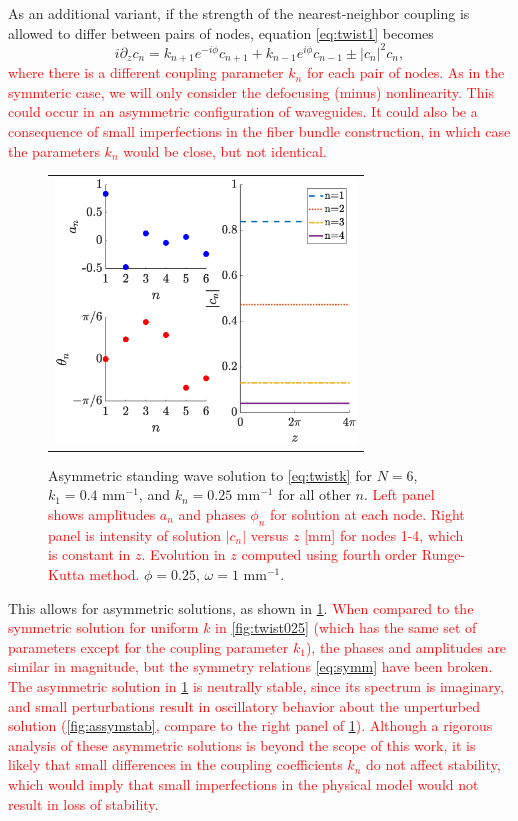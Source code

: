 \documentclass[reprint, amsmath,amssymb,aps,pra]{revtex4-2}
\def\noi{\noindent}
\renewcommand{\revised}[1]{ \textcolor{red}{#1} }
\begin{document}
As an additional variant, if the strength of the nearest-neighbor coupling is allowed to differ between pairs of nodes, equation \cref{eq:twist1} becomes
\begin{equation}\label{eq:twistk}
i \partial_z c_n = k_{n+1} e^{-i\phi}c_{n+1} + k_{n-1} e^{i\phi}c_{n-1} \pm |c_n|^2 c_n,
\end{equation}
\revised{where there is a different coupling parameter $k_n$ for each pair of nodes. As in the symmteric case, we will  only consider the defocusing (minus) nonlinearity. This could occur in an asymmetric configuration of waveguides. It could also be a consequence of small imperfections in the fiber bundle construction, in which case the parameters $k_n$ would be close, but not identical.}
\begin{figure}
\begin{center}
\begin{tabular}{c}
\includegraphics[width=8cm]{even6assym.eps}
\end{tabular}
\end{center}
\caption{Asymmetric standing wave solution to \cref{eq:twistk} for $N = 6$, $k_1 = 0.4\text{ mm}^{-1}$, and $k_n = 0.25\text{ mm}^{-1}$ for all other $n$. \revised{Left panel shows amplitudes $a_n$ and phases $\phi_n$ for solution at each node. Right panel is intensity of solution $|c_n|$ versus $z$ [mm] for nodes 1-4, which is constant in $z$. Evolution in $z$ computed using fourth order Runge-Kutta method.} $\phi = 0.25$, $\omega = 1\text{ mm}^{-1}$.}
\label{fig:even6assym}
\end{figure}
\noi This allows for asymmetric solutions, as shown in \cref{fig:even6assym}. \revised{When compared to the symmetric solution for uniform $k$ in \cref{fig:twist025} (which has the same set of parameters except for the coupling parameter $k_1$), the phases and amplitudes are similar in magnitude, but the symmetry relations \cref{eq:symm} have been broken. The asymmetric solution in \cref{fig:even6assym} is neutrally stable, since its spectrum is imaginary, and small perturbations result in oscillatory behavior about the unperturbed solution (\cref{fig:assymstab}, compare to the right panel of \cref{fig:even6assym}). Although a rigorous analysis of these asymmetric solutions is beyond the scope of this work, it is likely that small differences in the coupling coefficients $k_n$ do not affect stability, which would imply that small imperfections in the physical model would not result in loss of stability.}
\end{document}
